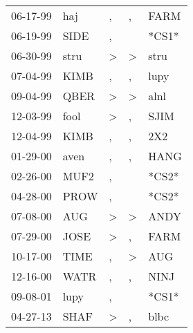 \begin{supertabular}{lllll}
 06-17-99 &   haj &             , &             , &   FARM \\
 06-19-99 &  SIDE &             , &               &  *CS1* \\
 06-30-99 &  stru &  \textgreater &  \textgreater &   stru \\
 07-04-99 &  KIMB &             , &             , &   lupy \\
 09-04-99 &  QBER &  \textgreater &  \textgreater &   alnl \\
 12-03-99 &  fool &  \textgreater &             , &   SJIM \\
 12-04-99 &  KIMB &             , &             , &    2X2 \\
 01-29-00 &  aven &             , &             , &   HANG \\
 02-26-00 &  MUF2 &             , &               &  *CS2* \\
 04-28-00 &  PROW &             , &               &  *CS2* \\
 07-08-00 &   AUG &  \textgreater &  \textgreater &   ANDY \\
 07-29-00 &  JOSE &  \textgreater &             , &   FARM \\
 10-17-00 &  TIME &             , &  \textgreater &    AUG \\
 12-16-00 &  WATR &             , &             , &   NINJ \\
 09-08-01 &  lupy &             , &               &  *CS1* \\
 04-27-13 &  SHAF &  \textgreater &             , &   blbc \\
\end{supertabular}
